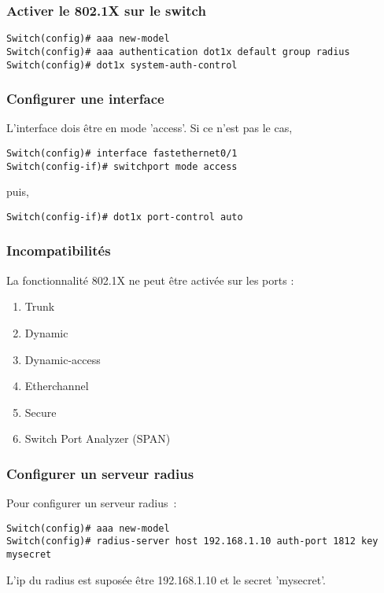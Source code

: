 \subsubsection{Activer le 802.1X sur le switch}

\begin{verbatim}
Switch(config)# aaa new-model
Switch(config)# aaa authentication dot1x default group radius
Switch(config)# dot1x system-auth-control
\end{verbatim}
\subsubsection{Configurer une interface}

L'interface dois être en mode 'access'. 
Si ce n'est pas le cas,
\begin{verbatim}
Switch(config)# interface fastethernet0/1
Switch(config-if)# switchport mode access
\end{verbatim}

puis,

\begin{verbatim}
Switch(config-if)# dot1x port-control auto
\end{verbatim}

\subsubsection{Incompatibilités}

La fonctionnalité 802.1X ne peut être activée sur les ports :
\begin{enumerate}
\item Trunk
\item Dynamic
\item Dynamic-access
\item Etherchannel
\item Secure
\item Switch Port Analyzer (SPAN)
\end{enumerate}


\subsubsection{Configurer un serveur radius}
Pour configurer un serveur radius~:
\begin{verbatim}
Switch(config)# aaa new-model
Switch(config)# radius-server host 192.168.1.10 auth-port 1812 key mysecret 
\end{verbatim}
L'ip du radius est suposée être 192.168.1.10 et le secret 'mysecret'.

